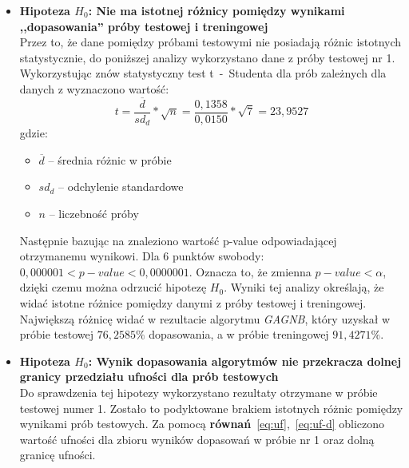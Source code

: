 \begin{itemize}
    \item \textbf{Hipoteza $H_0$: Nie ma istotnej różnicy pomiędzy wynikami ,,dopasowania'' próby testowej i treningowej} \\
    Przez to, że dane pomiędzy próbami testowymi nie posiadają różnic istotnych statystycznie, do poniższej analizy wykorzystano dane z próby testowej nr 1. Wykorzystując znów statystyczny test t~-~Studenta dla prób zależnych dla danych z  wyznaczono wartość:
    \begin{equation}
        \label{eq:test-t}
        t = \frac{\overline{d}}{sd_d} * \sqrt{n} = \frac{0,1358}{0,0150} * \sqrt{7} = 23,9527
    \end{equation}
    gdzie:
    \begin{itemize}
        \item $\overline{d}$ -- średnia różnic w próbie
        \item $sd_d$ -- odchylenie standardowe
        \item $n$ -- liczebność próby
    \end{itemize}
    Następnie bazując na   znaleziono wartość p-value odpowiadającej otrzymanemu wynikowi. Dla 6 punktów swobody: $0,000001 < p-value < 0,0000001$. Oznacza to, że zmienna $p-value < \alpha$, dzięki czemu można odrzucić hipotezę $H_0$. Wyniki tej analizy określają, że widać istotne różnice pomiędzy danymi z próby testowej i treningowej. Największą różnicę widać w rezultacie algorytmu \textit{GAGNB}, który uzyskał w próbie testowej $76,2585\%$ dopasowania, a w próbie treningowej $91,4271\%$.\\

    \item \textbf{Hipoteza $H_0$: Wynik dopasowania algorytmów nie przekracza dolnej granicy przedziału ufności dla prób testowych}\\
    Do sprawdzenia tej hipotezy wykorzystano rezultaty otrzymane w próbie testowej numer 1. Zostało to podyktowane brakiem istotnych różnic pomiędzy wynikami prób testowych. Za pomocą \textbf{równań}~\ref{eq:uf},~\ref{eq:uf-d} obliczono wartość ufności dla zbioru wyników dopasowań w próbie nr 1 oraz dolną granicę ufności.


\end{itemize}
